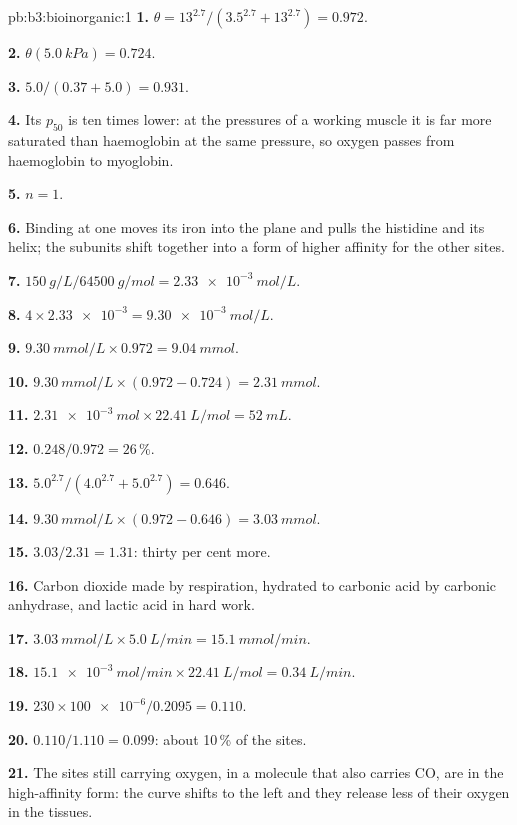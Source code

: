 \begin{solution}{pb:b3:bioinorganic:1}
\textbf{1.} $\theta = 13^{2.7}/(3.5^{2.7} + 13^{2.7}) = 0.972$.

\textbf{2.} $\theta(\qty{5.0}{kPa}) = 0.724$.

\textbf{3.} $5.0/(0.37 + 5.0) = 0.931$.

\textbf{4.} Its $p_{50}$ is ten times lower: at the pressures of a working muscle it is far more
saturated than haemoglobin at the same pressure, so oxygen passes from
haemoglobin to myoglobin.

\textbf{5.} $n = 1$.

\textbf{6.} Binding at one  moves its iron into the plane and pulls the histidine and
its helix; the subunits shift together into a form of higher affinity for the
other sites.

\textbf{7.} $\qty{150}{g/L}/\qty{64500}{g/mol} = \qty{2.33e-3}{mol/L}$.

\textbf{8.} $4 \times \num{2.33e-3} = \qty{9.30e-3}{mol/L}$.

\textbf{9.} $\qty{9.30}{mmol/L} \times 0.972 = \qty{9.04}{mmol}$.

\textbf{10.} $\qty{9.30}{mmol/L} \times (0.972 - 0.724) = \qty{2.31}{mmol}$.

\textbf{11.} $\qty{2.31e-3}{mol} \times \qty{22.41}{L/mol} = \qty{52}{mL}$.

\textbf{12.} $0.248/0.972 = 26$\,\%.

\textbf{13.} $5.0^{2.7}/(4.0^{2.7} + 5.0^{2.7}) = 0.646$.

\textbf{14.} $\qty{9.30}{mmol/L} \times (0.972 - 0.646) = \qty{3.03}{mmol}$.

\textbf{15.} $3.03/2.31 = 1.31$: thirty per cent more.

\textbf{16.} Carbon dioxide made by respiration, hydrated to carbonic acid by
carbonic anhydrase, and lactic acid in hard work.

\textbf{17.} $\qty{3.03}{mmol/L} \times \qty{5.0}{L/min} = \qty{15.1}{mmol/min}$.

\textbf{18.} $\qty{15.1e-3}{mol/min} \times \qty{22.41}{L/mol} = \qty{0.34}{L/min}$.

\textbf{19.} $230 \times \num{100e-6}/0.2095 = 0.110$.

\textbf{20.} $0.110/1.110 = 0.099$: about 10\,\% of the sites.

\textbf{21.} The sites still carrying oxygen, in a molecule that also carries CO, are in
the high-affinity form: the curve shifts to the left and they release less of
their oxygen in the tissues.


\end{solution}
